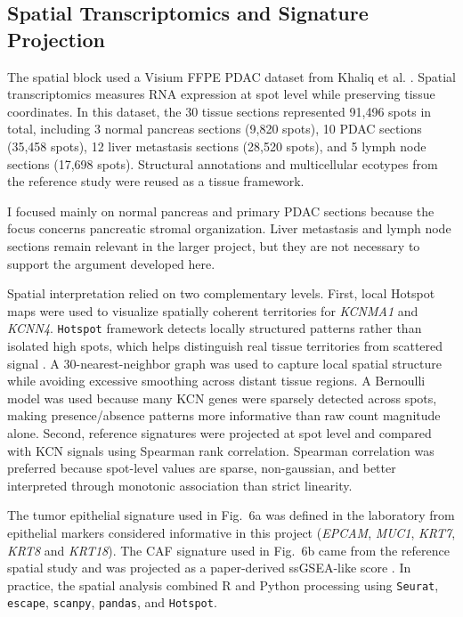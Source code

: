 \documentclass[11pt,a4paper]{article}
\begin{document}
\subsection{Spatial Transcriptomics and Signature Projection}
The spatial block used a Visium FFPE PDAC dataset from Khaliq et al. \citep{khaliq2024}. Spatial transcriptomics measures RNA expression at spot level while preserving tissue coordinates. In this dataset, the 30 tissue sections represented 91,496 spots in total, including 3 normal pancreas sections (9,820 spots), 10 PDAC sections (35,458 spots), 12 liver metastasis sections (28,520 spots), and 5 lymph node sections (17,698 spots). Structural annotations and multicellular ecotypes from the reference study were reused as a tissue framework.

I focused mainly on normal pancreas and primary PDAC sections because the focus concerns pancreatic stromal organization. Liver metastasis and lymph node sections remain relevant in the larger project, but they are not necessary to support the argument developed here.

Spatial interpretation relied on two complementary levels. First, local Hotspot maps were used to visualize spatially coherent territories for \textit{KCNMA1} and \textit{KCNN4}. \texttt{Hotspot} framework detects locally structured patterns rather than isolated high spots, which helps distinguish real tissue territories from scattered signal \citep{detomaso2021}. A 30-nearest-neighbor graph was used to capture local spatial structure while avoiding excessive smoothing across distant tissue regions. A Bernoulli model was used because many KCN genes were sparsely detected across spots, making presence/absence patterns more informative than raw count magnitude alone. Second, reference signatures were projected at spot level and compared with KCN signals using Spearman rank correlation. Spearman correlation was preferred because spot-level values are sparse, non-gaussian, and better interpreted through monotonic association than strict linearity.

The tumor epithelial signature used in Fig.~6a was defined in the laboratory from epithelial markers considered informative in this project (\textit{EPCAM}, \textit{MUC1}, \textit{KRT7}, \textit{KRT8} and \textit{KRT18}). The CAF signature used in Fig.~6b came from the reference spatial study and was projected as a paper-derived ssGSEA-like score \citep{khaliq2024}. In practice, the spatial analysis combined R and Python processing using \texttt{Seurat}, \texttt{escape}, \texttt{scanpy}, \texttt{pandas}, and \texttt{Hotspot}.
\end{document}
